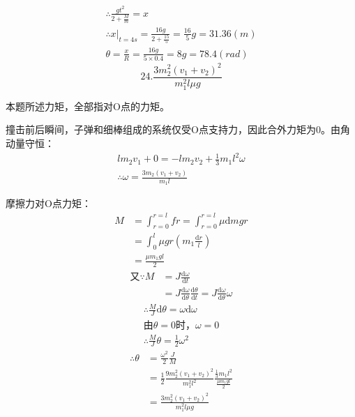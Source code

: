 \documentclass[b5paper,opensource]{./template/qyxf-book}
\newcommand{\di}[1]{\mathrm{d}#1}
\newcommand{\dy}[2]{\frac{\di{#1}}{\di{#2}}}
\begin{document}
		\begin{gather*}
		\therefore \frac{gt^2}{2+\frac{M}{m}}=x\\
		\therefore x\left.\right|_{t=4s}=\frac{16g}{2+\frac{15}{5}}=\frac{16}{5}g=31.36(m)\\
		\theta=\frac{x}{R}=\frac{16g}{5\times 0.4}=8g=78.4(rad)
		\end{gather*}
		\[24.\frac{3m_2^2(v_1+v_2)^2}{m_1^2l\mu g}\]\par
		本题所述力矩，全部指对O点的力矩。\par
		撞击前后瞬间，子弹和细棒组成的系统仅受O点支持力，因此合外力矩为0。由角动量守恒：
		\begin{gather*}
		lm_2v_1+0=-lm_2v_2+\frac{1}{3}m_1l^2\omega\\
		\therefore \omega=\frac{3m_2(v_1+v_2)}{m_1l}
			\end{gather*}\par
			摩擦力对O点力矩：
			\begin{align*}
			M	&=\int_{r=0}^{r=l}fr=\int_{r=0}^{r=l}\mu \di{m}gr\\
			&=\int_0^l\mu gr\left(m_1\frac{\di{r}}{l}\right)\\
			&=\frac{\mu m_1gl}{2}
			\end{align*}
			\begin{align*}
			\text{又}\because M&=J\dy{\omega}{t}\\
			&=J\dy{\omega}{\theta}\dy{\theta}{t}=J\dy{\omega}{\theta}\omega
			\end{align*}
			\begin{gather*}
			\therefore \frac{M}{J}\di{\theta}=\omega\di{\omega}\\
			\text{由}\theta=0\text{时}，\omega=0\\
			\therefore \frac{M}{J}\theta=\frac{1}{2}\omega^2
			\end{gather*}
			\begin{align*}
			\therefore \theta&=\frac{\omega^2}{2}\frac{J}{M}\\
			&=\frac{1}{2}\frac{9m_2^2(v_1+v_2)^2}{m_1^2l^2}\frac{\frac{1}{3}m_1l^2}{\frac{\mu m_1gl}{2}}\\
			&=\frac{3m_2^2(v_1+v_2)^2}{m_1^2l\mu g}
			\end{align*}

	
	
\end{document}

